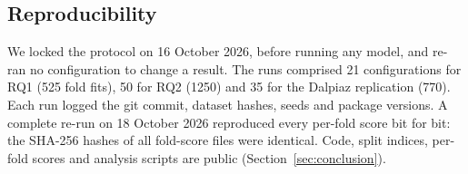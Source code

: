 \subsection{Reproducibility}

We locked the protocol on 16 October 2026, before running any model, and re-ran no configuration to change a result. The runs comprised 21 configurations for RQ1 (525 fold fits), 50 for RQ2 (1250) and 35 for the Dalpiaz replication (770). Each run logged the git commit, dataset hashes, seeds and package versions. A complete re-run on 18 October 2026 reproduced every per-fold score bit for bit: the SHA-256 hashes of all fold-score files were identical. Code, split indices, per-fold scores and analysis scripts are public (Section~\ref{sec:conclusion}).
